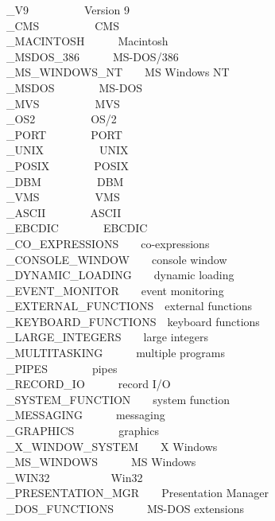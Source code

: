\_V9\ \ \ \ \ \ \ \ \ \ Version 9\\
\_CMS\ \ \ \ \ \ \ \ \ \ CMS\\
\_MACINTOSH\ \ \ \ \ \ Macintosh\\
\_MSDOS\_386\ \ \ \ \ \ MS-DOS/386\\
\_MS\_WINDOWS\_NT\ \ \ \ MS Windows NT\\
\_MSDOS\ \ \ \ \ \ \ \ MS-DOS\\
\_MVS\ \ \ \ \ \ \ \ \ \ MVS\\
\_OS2\ \ \ \ \ \ \ \ \ \ OS/2\\
\_PORT\ \ \ \ \ \ \ \ PORT\\
\_UNIX\ \ \ \ \ \ \ \ \ \ UNIX\\
\_POSIX\ \ \ \ \ \ \ \ POSIX\\
\_DBM\ \ \ \ \ \ \ \ \ \ DBM\\
\_VMS\ \ \ \ \ \ \ \ \ \ VMS\\
\_ASCII\ \ \ \ \ \ \ \ ASCII\\
\_EBCDIC\ \ \ \ \ \ \ \ EBCDIC\\
\_CO\_EXPRESSIONS\ \ \ \ co-expressions\\
\_CONSOLE\_WINDOW\ \ \ \ console window\\
\_DYNAMIC\_LOADING\ \ \ \ dynamic loading\\
\_EVENT\_MONITOR\ \ \ \ event monitoring\\
\_EXTERNAL\_FUNCTIONS\ \ external functions\\
\_KEYBOARD\_FUNCTIONS\ \ keyboard functions\\
\_LARGE\_INTEGERS\ \ \ \ large integers\\
\_MULTITASKING\ \ \ \ \ \ multiple programs\\
\_PIPES\ \ \ \ \ \ \ \ pipes\\
\_RECORD\_IO\ \ \ \ \ \ record I/O\\
\_SYSTEM\_FUNCTION\ \ \ \ system function\\
\_MESSAGING\ \ \ \ \ \ messaging\\
\_GRAPHICS\ \ \ \ \ \ \ \ graphics\\
\_X\_WINDOW\_SYSTEM\ \ \ \ X Windows\\
\_MS\_WINDOWS\ \ \ \ \ \ MS Windows\\
\_WIN32\ \ \ \ \ \ \ \ \ \ \ Win32\\
\_PRESENTATION\_MGR\ \ \ \ Presentation Manager\\
\_DOS\_FUNCTIONS\ \ \ \ \ \ MS-DOS extensions

